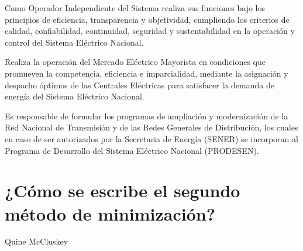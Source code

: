 \documentclass{mylib/reporte}
\begin{document}
Como Operador Independiente del Sistema realiza sus funciones bajo los principios de eficiencia, transparencia y objetividad, cumpliendo los criterios de calidad, confiabilidad, continuidad, seguridad y sustentabilidad en la operación y control del Sistema Eléctrico Nacional.

Realiza la operación del Mercado Eléctrico Mayorista en condiciones que promueven la competencia, eficiencia e imparcialidad, mediante la asignación y despacho óptimos de las Centrales Eléctricas para satisfacer la demanda de energía del Sistema Eléctrico Nacional.

Es responsable de formular los programas de ampliación y modernización de la Red Nacional de Transmisión y de las Redes Generales de Distribución, los cuales en caso de ser autorizados por la Secretaria de Energía (SENER) se incorporan al Programa de Desarrollo del Sistema Eléctrico Nacional (PRODESEN).


\section{¿Cómo se escribe el segundo método de minimización?}

 Quine McCluskey
\end{document}
